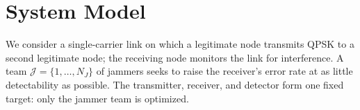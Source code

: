 %

\section{System Model}
\label{sec:system}

We consider a single-carrier link on which a legitimate node transmits QPSK to a second legitimate node; the receiving node monitors the link for interference.
A team $\mathcal{J}=\{1,\ldots,N_J\}$ of jammers seeks to raise the receiver's error rate at as little detectability as possible.
The transmitter, receiver, and detector form one fixed target: only the jammer team is optimized.

